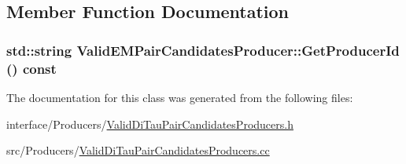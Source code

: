 \subsection{Member Function Documentation}
\hypertarget{classValidEMPairCandidatesProducer_a6f5a4c8e1838d24fa276cef1488b29af}{
\subsubsection[{GetProducerId}]{\setlength{\rightskip}{0pt plus 5cm}std::string ValidEMPairCandidatesProducer::GetProducerId () const}}
\label{classValidEMPairCandidatesProducer_a6f5a4c8e1838d24fa276cef1488b29af}


The documentation for this class was generated from the following files:\begin{DoxyCompactItemize}
\item 
interface/Producers/\hyperlink{ValidDiTauPairCandidatesProducers_8h}{ValidDiTauPairCandidatesProducers.h}\item 
src/Producers/\hyperlink{ValidDiTauPairCandidatesProducers_8cc}{ValidDiTauPairCandidatesProducers.cc}\end{DoxyCompactItemize}
